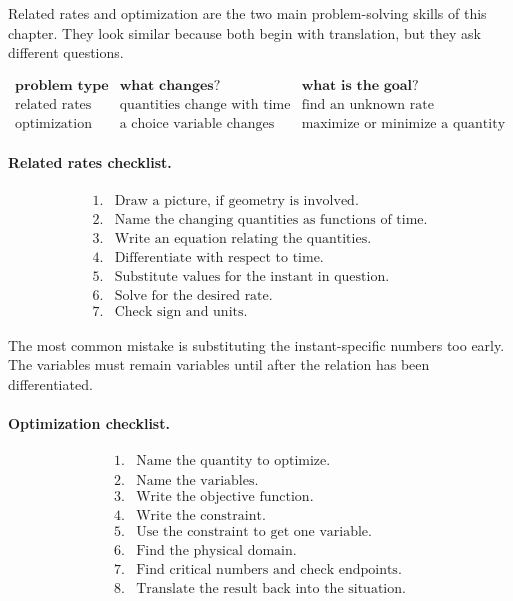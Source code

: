 Related rates and optimization are the two main problem-solving skills of this chapter.
They look similar because both begin with translation, but they ask different questions.

\[
\begin{array}{c|c|c}
\textbf{problem type} & \textbf{what changes?} & \textbf{what is the goal?} \\ \hline
\text{related rates} & \text{quantities change with time} & \text{find an unknown rate} \\[4pt]
\text{optimization} & \text{a choice variable changes} & \text{maximize or minimize a quantity}
\end{array}
\]

\paragraph{Related rates checklist.}

\[
\begin{array}{ll}
\text{1.} & \text{Draw a picture, if geometry is involved.}\\
\text{2.} & \text{Name the changing quantities as functions of time.}\\
\text{3.} & \text{Write an equation relating the quantities.}\\
\text{4.} & \text{Differentiate with respect to time.}\\
\text{5.} & \text{Substitute values for the instant in question.}\\
\text{6.} & \text{Solve for the desired rate.}\\
\text{7.} & \text{Check sign and units.}
\end{array}
\]

The most common mistake is substituting the instant-specific numbers too early.  The
variables must remain variables until after the relation has been differentiated.

\paragraph{Optimization checklist.}

\[
\begin{array}{ll}
\text{1.} & \text{Name the quantity to optimize.}\\
\text{2.} & \text{Name the variables.}\\
\text{3.} & \text{Write the objective function.}\\
\text{4.} & \text{Write the constraint.}\\
\text{5.} & \text{Use the constraint to get one variable.}\\
\text{6.} & \text{Find the physical domain.}\\
\text{7.} & \text{Find critical numbers and check endpoints.}\\
\text{8.} & \text{Translate the result back into the situation.}
\end{array}
\]

